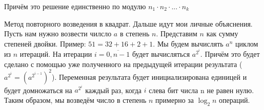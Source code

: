 \documentclass[a4paper,10pt]{article} %
\begin{document}
	Причём это решение единственно по модулю $n_{1} \cdot n_{2} \cdot ... \cdot n_{k}$
	
	Метод повторного возведения в квадрат. Дальше идут мои личные объяснения.
	Пусть нам нужно возвести чилсло $a$ в степень $n$. Представим $n$ как 
	сумму степеней двойки. Пример: $51 = 32 + 16 + 2 + 1$. Мы будем вычислять
	$a^{n}$ циклом из $n$ итераций. На итерации $i = \overline{0, n - 1}$ будет вычисляться $a^{2^{i}}$. Причём это будет сделано с помощью уже полученного на предыдущей итерации результата ($a^{2^{i}} =(a^{2^{i-1}})^{2}$). Переменная результата будет инициализирована единицей и будет домножаться на $a^{2^{i}}$ каждый раз, когда $i$ слева бит числа n не равен нулю. Таким образом, мы возведём число в степень $n$ примерно за $\log_{2}{n}$ операций.
	
	
\end{document}
